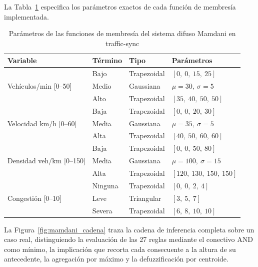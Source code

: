 La Tabla~\ref{tab:fuzzy_mf} especifica los parámetros exactos de cada función de membresía implementada.

\begin{table}[htbp]
\renewcommand{\arraystretch}{1.25}
\caption{Parámetros de las funciones de membresía del sistema difuso Mamdani en traffic-sync}
\label{tab:fuzzy_mf}
\centering
\footnotesize
\begin{tabular}{llll}
\hline
\textbf{Variable} & \textbf{Término} & \textbf{Tipo} & \textbf{Parámetros} \\
\hline
\multirow{3}{*}{Vehículos/min [0--50]} & Bajo  & Trapezoidal & $[0,\ 0,\ 15,\ 25]$ \\
                                        & Medio & Gaussiana   & $\mu=30,\ \sigma=5$ \\
                                        & Alto  & Trapezoidal & $[35,\ 40,\ 50,\ 50]$ \\
\hline
\multirow{3}{*}{Velocidad km/h [0--60]} & Baja  & Trapezoidal & $[0,\ 0,\ 20,\ 30]$ \\
                                         & Media & Gaussiana   & $\mu=35,\ \sigma=5$ \\
                                         & Alta  & Trapezoidal & $[40,\ 50,\ 60,\ 60]$ \\
\hline
\multirow{3}{*}{Densidad veh/km [0--150]} & Baja  & Trapezoidal & $[0,\ 0,\ 50,\ 80]$ \\
                                           & Media & Gaussiana   & $\mu=100,\ \sigma=15$ \\
                                           & Alta  & Trapezoidal & $[120,\ 130,\ 150,\ 150]$ \\
\hline
\multirow{3}{*}{Congestión [0--10]}    & Ninguna & Trapezoidal & $[0,\ 0,\ 2,\ 4]$ \\
                                        & Leve    & Triangular  & $[3,\ 5,\ 7]$ \\
                                        & Severa  & Trapezoidal & $[6,\ 8,\ 10,\ 10]$ \\
\hline
\end{tabular}
\end{table}

La Figura~\ref{fig:mamdani_cadena} traza la cadena de inferencia completa sobre un caso real, distinguiendo la evaluación de las 27 reglas mediante el conectivo AND como mínimo, la implicación que recorta cada consecuente a la altura de su antecedente, la agregación por máximo y la defuzzificación por centroide.

